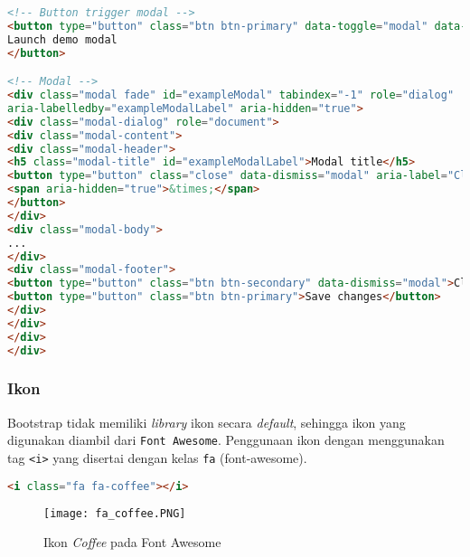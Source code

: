 \begin{lstlisting}[language=HTML,  basicstyle=\ttfamily, frame=single, columns=fullflexible, keepspaces=true, breaklines=true, showstringspaces=false, label={lst:modalBootstrap}, caption=Modal bar pada bootstrap 4.] 
<!-- Button trigger modal -->
<button type="button" class="btn btn-primary" data-toggle="modal" data-target="#myModal">
Launch demo modal
</button>

<!-- Modal -->
<div class="modal fade" id="exampleModal" tabindex="-1" role="dialog" 
aria-labelledby="exampleModalLabel" aria-hidden="true">
<div class="modal-dialog" role="document">
<div class="modal-content">
<div class="modal-header">
<h5 class="modal-title" id="exampleModalLabel">Modal title</h5>
<button type="button" class="close" data-dismiss="modal" aria-label="Close">
<span aria-hidden="true">&times;</span>
</button>
</div>
<div class="modal-body">
...
</div>
<div class="modal-footer">
<button type="button" class="btn btn-secondary" data-dismiss="modal">Close</button>
<button type="button" class="btn btn-primary">Save changes</button>
</div>
</div>
</div>
</div>
\end{lstlisting}

\subsubsection{Ikon}
Bootstrap tidak memiliki \textit{library} ikon secara \textit{default}, sehingga ikon yang digunakan diambil dari \texttt{Font Awesome}. Penggunaan ikon dengan menggunakan tag \texttt{<i>} yang disertai dengan kelas \texttt{fa} (font-awesome). 

\begin{lstlisting}[language=HTML,  basicstyle=\ttfamily, frame=single, columns=fullflexible, keepspaces=true, breaklines=true, showstringspaces=false, label={lst:ikonBootstrap}, caption=Ikon pada bootstrap 4.]
<i class="fa fa-coffee"></i>
\end{lstlisting}

\begin{figure} [H]
	\centering  
	\texttt{[image: fa\_coffee.PNG]}  
	\caption{Ikon \textit{Coffee} pada Font Awesome} 
	\label{fig:fontAwesomeBootstrap}
\end{figure}
